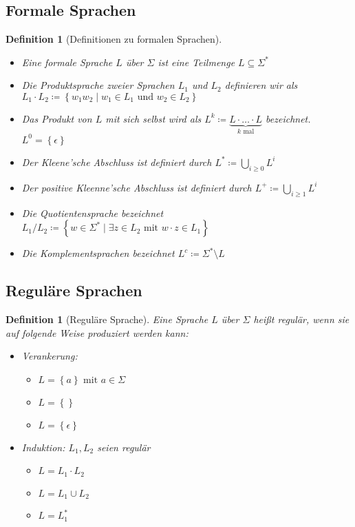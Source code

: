 \documentclass[11pt]{article}
\newcommand{\set}[1]{\left\lbrace #1\right\rbrace}
\theoremstyle{break}
\newtheorem{defi}[satz]{Definition}
\begin{document}
\subsection{Formale Sprachen}

\begin{defi}[Definitionen zu formalen Sprachen]
\begin{itemize}
\item Eine formale Sprache $L$ über $\Sigma$ ist eine Teilmenge $L\subseteq\Sigma^*$
\item Die Produktsprache zweier Sprachen $L_1$ und $L_2$ definieren wir als\\ $L_1\cdot L_2\coloneqq\set{w_1w_2\mid w_1\in L_1\text{ und } w_2\in L_2}$
\item Das Produkt von $L$ mit sich selbst wird als $L^k\coloneqq \underbrace{L\cdot\dots\cdot L}_{k\text{ mal}}$ bezeichnet. $L^0 = \set{\epsilon}$
\item Der Kleene'sche Abschluss ist definiert durch $L^*\coloneqq \bigcup\limits_{i\geq 0} L^i$ 
\item Der positive Kleenne'sche Abschluss ist definiert durch $L^+\coloneqq \bigcup\limits_{i\geq 1} L^i$ 
\item Die Quotientensprache bezeichnet $L_1/L_2\coloneqq\set{w\in \Sigma^*\mid\exists z\in L_2\text{ mit } w\cdot z\in L_1}$
\item Die Komplementsprachen bezeichnet $L^c\coloneqq\Sigma^*\setminus L$
\end{itemize}
\end{defi}


\subsection{Reguläre Sprachen}

\begin{defi}[Reguläre Sprache] 
Eine Sprache $L$ über $\Sigma$ heißt regulär, wenn sie auf folgende Weise produziert werden kann:
\begin{itemize}
\item Verankerung:
\begin{itemize}
\item $L=\set{a}\text{ mit } a\in\Sigma$
\item $L=\set{}$
\item $L=\set{\epsilon}$
\end{itemize}
\item Induktion: $L_1,L_2$ seien regulär
\begin{itemize}
\item $L=L_1\cdot L_2$
\item $L=L_1\cup L_2$
\item $L=L_1^*$
\end{itemize}
\end{itemize}
\end{defi}
\end{document}
